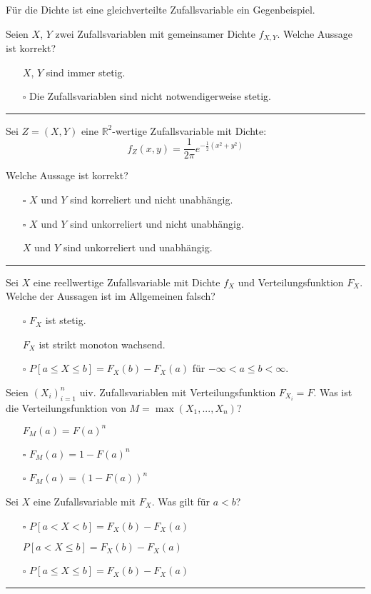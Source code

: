 \begin{tiny}
Für die Dichte ist eine gleichverteilte Zufallsvariable ein Gegenbeispiel.

Seien $X$, $Y$ zwei Zufallsvariablen mit gemeinsamer Dichte $f_{X,Y}$. Welche Aussage ist korrekt?
\begin{itemize}
    \item[\checkmark] $X$, $Y$ sind immer stetig.
    \item[$\square$] Die Zufallsvariablen sind nicht notwendigerweise stetig.
\end{itemize}
\rule{\linewidth}{0.4pt}

Sei $Z = (X, Y)$ eine $\mathbb{R}^2$-wertige Zufallsvariable mit Dichte:
\[ f_Z (x, y) = \frac{1}{2\pi} e^{-\frac{1}{2} (x^2 + y^2)} \]

Welche Aussage ist korrekt?
\begin{itemize}
    \item[$\square$] $X$ und $Y$ sind korreliert und nicht unabhängig.
    \item[$\square$] $X$ und $Y$ sind unkorreliert und nicht unabhängig.
    \item[\checkmark] $X$ und $Y$ sind unkorreliert und unabhängig.
\end{itemize}
\rule{\linewidth}{0.4pt}

Sei $X$ eine reellwertige Zufallsvariable mit Dichte $f_X$ und Verteilungsfunktion $F_X$. Welche der Aussagen ist im Allgemeinen falsch?
\begin{itemize}
    \item[$\square$] $F_X$ ist stetig.
    \item[\checkmark] $F_X$ ist strikt monoton wachsend.
    \item[$\square$] $P[a \leq X \leq b] = F_X(b) - F_X(a)$ für $-\infty < a \leq b < \infty$.
\end{itemize}

Seien $(X_i)_{i=1}^n$ uiv. Zufallsvariablen mit Verteilungsfunktion $F_{X_i} = F$. Was ist die Verteilungsfunktion von $M = \max(X_1, ..., X_n)$?
\begin{itemize}
    \item[\checkmark] $F_M (a) = F(a)^n$
    \item[$\square$] $F_M (a) = 1 - F(a)^n$
    \item[$\square$] $F_M (a) = (1 - F(a))^n$
\end{itemize}

Sei $X$ eine Zufallsvariable mit $F_X$. Was gilt für $a < b$?
\begin{itemize}
    \item[$\square$] $P[a < X < b] = F_X(b) - F_X(a)$
    \item[\checkmark] $P[a < X \leq b] = F_X(b) - F_X(a)$
    \item[$\square$] $P[a \leq X \leq b] = F_X(b) - F_X(a)$
\end{itemize}
\rule{\linewidth}{0.4pt}


\end{tiny}
